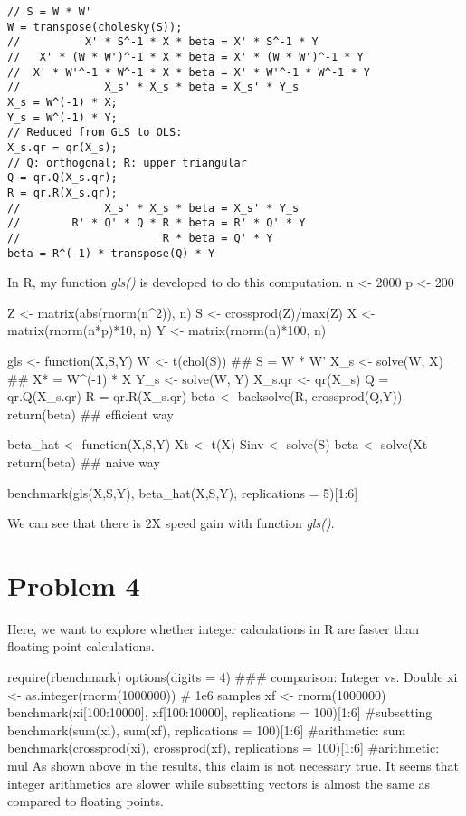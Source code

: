 \documentclass{article}
\begin{document}
\begin{lstlisting}
// S = W * W'
W = transpose(cholesky(S)); 
//          X' * S^-1 * X * beta = X' * S^-1 * Y
//   X' * (W * W')^-1 * X * beta = X' * (W * W')^-1 * Y
//  X' * W'^-1 * W^-1 * X * beta = X' * W'^-1 * W^-1 * Y
//             X_s' * X_s * beta = X_s' * Y_s			
X_s = W^(-1) * X;
Y_s = W^(-1) * Y;
// Reduced from GLS to OLS:
X_s.qr = qr(X_s); 
// Q: orthogonal; R: upper triangular
Q = qr.Q(X_s.qr);  
R = qr.R(X_s.qr); 
//             X_s' * X_s * beta = X_s' * Y_s			
//        R' * Q' * Q * R * beta = R' * Q' * Y
//                      R * beta = Q' * Y
beta = R^(-1) * transpose(Q) * Y
\end{lstlisting}

In R, my function \textit{gls()} is developed to do this computation.
n <- 2000
p <- 200

Z <- matrix(abs(rnorm(n^2)), n)
S <- crossprod(Z)/max(Z)
X <- matrix(rnorm(n*p)*10, n)
Y <- matrix(rnorm(n)*100, n)

gls <- function(X,S,Y){
	W <- t(chol(S)) ## S = W * W'
	X_s <- solve(W, X) ## X* = W^(-1) * X
	Y_s <- solve(W, Y)
	X_s.qr <- qr(X_s)
	Q = qr.Q(X_s.qr)
	R = qr.R(X_s.qr)
	beta <- backsolve(R, crossprod(Q,Y))	
	return(beta) ## efficient way
}

beta_hat <- function(X,S,Y){
	Xt <- t(X)
	Sinv <- solve(S)
	beta <- solve(Xt %
	return(beta) ## naive way
}

benchmark(gls(X,S,Y), beta_hat(X,S,Y), replications = 5)[1:6]


We can see that there is 2X speed gain with function \textit{gls()}.

\newpage
\section*{Problem 4}
Here, we want to explore whether integer calculations in R are faster than
floating point calculations.

require(rbenchmark)
options(digits = 4)
### comparison: Integer vs. Double
xi <- as.integer(rnorm(1000000)) # 1e6 samples
xf <- rnorm(1000000)
benchmark(xi[100:10000], xf[100:10000], replications = 100)[1:6] #subsetting
benchmark(sum(xi), sum(xf), replications = 100)[1:6] #arithmetic: sum
benchmark(crossprod(xi), crossprod(xf), replications = 100)[1:6] #arithmetic: mul
As shown above in the results, this claim is not necessary true. It seems that 
integer arithmetics are slower while subsetting vectors is almost the same as compared to
floating points.
\end{document}

